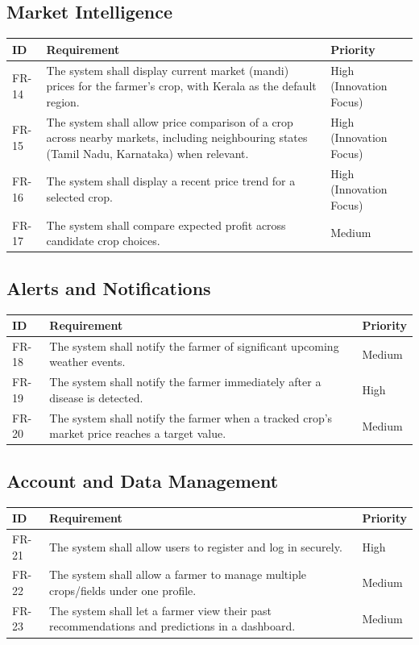 \documentclass[12pt,a4paper]{article}
\begin{document}
\subsection{Market Intelligence}
\begin{longtable}{p{1.4cm} p{9cm} p{2.3cm}}
\toprule
\textbf{ID} & \textbf{Requirement} & \textbf{Priority} \\
\midrule
\endhead
FR-14 & The system shall display current market (mandi) prices for the farmer's crop, with Kerala as the default region. & High (Innovation Focus) \\
FR-15 & The system shall allow price comparison of a crop across nearby markets, including neighbouring states (Tamil Nadu, Karnataka) when relevant. & High (Innovation Focus) \\
FR-16 & The system shall display a recent price trend for a selected crop. & High (Innovation Focus) \\
FR-17 & The system shall compare expected profit across candidate crop choices. & Medium \\
\bottomrule
\end{longtable}

\subsection{Alerts and Notifications}
\begin{longtable}{p{1.4cm} p{9cm} p{2.3cm}}
\toprule
\textbf{ID} & \textbf{Requirement} & \textbf{Priority} \\
\midrule
\endhead
FR-18 & The system shall notify the farmer of significant upcoming weather events. & Medium \\
FR-19 & The system shall notify the farmer immediately after a disease is detected. & High \\
FR-20 & The system shall notify the farmer when a tracked crop's market price reaches a target value. & Medium \\
\bottomrule
\end{longtable}

\subsection{Account and Data Management}
\begin{longtable}{p{1.4cm} p{9cm} p{2.3cm}}
\toprule
\textbf{ID} & \textbf{Requirement} & \textbf{Priority} \\
\midrule
\endhead
FR-21 & The system shall allow users to register and log in securely. & High \\
FR-22 & The system shall allow a farmer to manage multiple crops/fields under one profile. & Medium \\
FR-23 & The system shall let a farmer view their past recommendations and predictions in a dashboard. & Medium \\
\bottomrule
\end{longtable}
\end{document}
